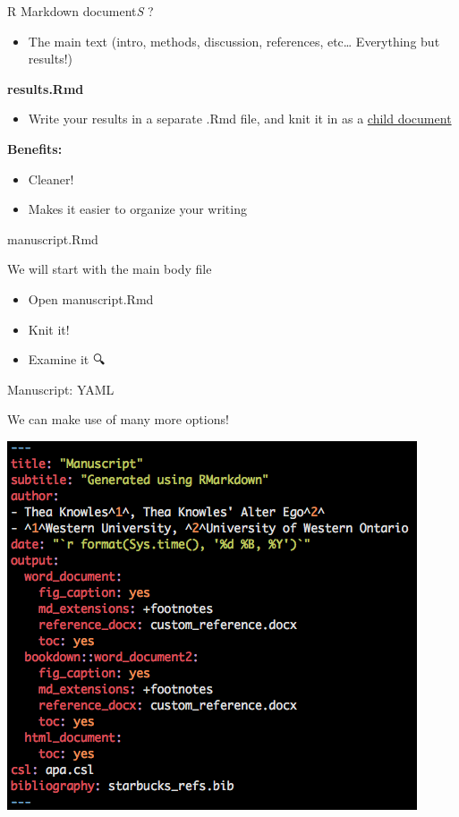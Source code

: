 \documentclass[
  ignorenonframetext,
]{beamer}
\providecommand{\tightlist}{%
  \setlength{\itemsep}{0pt}\setlength{\parskip}{0pt}}
\begin{document}
\begin{frame}[fragile]
\begin{block}{R Markdown document\emph{S} ?}
\begin{itemize}
\tightlist
\item
  The main text (intro, methods, discussion, references, etc\ldots{}
  Everything but results!)
\end{itemize}

\textbf{results.Rmd}

\begin{itemize}
\tightlist
\item
  Write your results in a separate .Rmd file, and knit it in as a
  \href{https://yihui.name/knitr/demo/child/}{child document}
\end{itemize}

\textbf{Benefits:}

\begin{itemize}
\tightlist
\item
  Cleaner!
\item
  Makes it easier to organize your writing
\end{itemize}

\end{block}

\begin{block}{manuscript.Rmd}

We will start with the main body file

\begin{itemize}
\tightlist
\item
  Open manuscript.Rmd
\item
  Knit it!
\item
  Examine it 🔍
\end{itemize}

\end{block}

\begin{block}{Manuscript: YAML}

We can make use of many more options!

\includegraphics{images/manuscript_yaml.png}


\end{block}
\end{frame}
\end{document}
